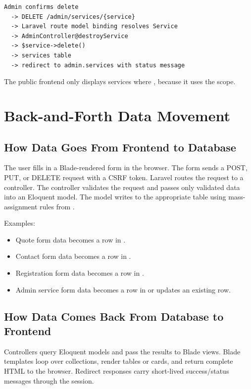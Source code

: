\documentclass[11pt,a4paper]{article}
\begin{document}
\begin{verbatim}
Admin confirms delete
  -> DELETE /admin/services/{service}
  -> Laravel route model binding resolves Service
  -> AdminController@destroyService
  -> $service->delete()
  -> services table
  -> redirect to admin.services with status message
\end{verbatim}

The public frontend only displays services where , because it uses the  scope.

\section{Back-and-Forth Data Movement}

\subsection{How Data Goes From Frontend to Database}

The user fills in a Blade-rendered form in the browser. The form sends a POST, PUT, or DELETE request with a CSRF token. Laravel routes the request to a controller. The controller validates the request and passes only validated data into an Eloquent model. The model writes to the appropriate table using mass-assignment rules from .

Examples:

\begin{itemize}
    \item Quote form data becomes a row in .
    \item Contact form data becomes a row in .
    \item Registration form data becomes a row in .
    \item Admin service form data becomes a row in  or updates an existing row.
\end{itemize}

\subsection{How Data Comes Back From Database to Frontend}

Controllers query Eloquent models and pass the results to Blade views. Blade templates loop over collections, render tables or cards, and return complete HTML to the browser. Redirect responses carry short-lived success/status messages through the session.
\end{document}
